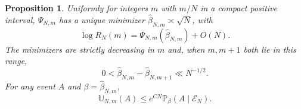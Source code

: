 \documentclass[11pt]{amsart}
\newtheorem{proposition}[theorem]{Proposition}
\theoremstyle{remark}
\newcommand{\Pp}{\mathbb P}
\begin{document}
\begin{proposition}
\label{prop:saddle}
Uniformly for integers \(m\) with \(m/N\) in a compact positive interval, \(\Psi_{N,m}\) has a unique minimizer \(\widehat\beta_{N,m}\asymp\sqrt N\), with
\begin{equation}
 \log R_N(m)=\Psi_{N,m}(\widehat\beta_{N,m})+O(N).
 \label{eq:sharp-saddle}
\end{equation}
The minimizers are strictly decreasing in \(m\) and, when \(m,m+1\) both lie in this range,
\begin{equation}
 0<\widehat\beta_{N,m}-\widehat\beta_{N,m+1}\ll N^{-1/2}.
 \label{eq:saddle-difference}
\end{equation}
For any event \(A\) and \(\beta=\widehat\beta_{N,m}\),
\begin{equation}
 \mathbb U_{N,m}(A)\le e^{CN}\Pp_\beta(A\mid \mathcal E_N).
 \label{eq:transfer}
\end{equation}
\end{proposition}
\end{document}
